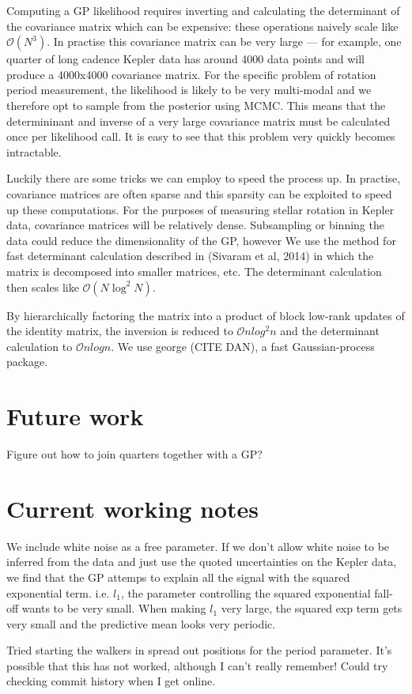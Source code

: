 \documentclass[12pt,preprint]{aastex}
\begin{document}
Computing a GP likelihood requires inverting and calculating the determinant of the covariance matrix which can be expensive:
these operations naively scale like $\mathcal{O}(N^3)$.
In practise this covariance matrix can be very large --- for example, one quarter of long cadence Kepler data has around 4000 data points and will produce a 4000x4000 covariance matrix.
For the specific problem of rotation period measurement, the likelihood is likely to be very multi-modal and we therefore opt to sample from the posterior using MCMC.
This means that the determininant and inverse of a very large covariance matrix must be calculated once per likelihood call.
It is easy to see that this problem very quickly becomes intractable.

Luckily there are some tricks we can employ to speed the process up. %
In practise, covariance matrices are often sparse and this sparsity can be exploited to speed up these computations.
For the purposes of measuring stellar rotation in Kepler data, covariance matrices will be relatively dense.
Subsampling or binning the data could reduce the dimensionality of the GP, however %
We use the method for fast determinant calculation described in (Sivaram et al, 2014) in which the matrix is decomposed into smaller matrices, etc.
The determinant calculation then scales like $\mathcal{O}(N\log^2{N})$.

By hierarchically factoring the matrix into a product of block low-rank updates of the identity matrix, the inversion is reduced to $\mathcal{O}nlog^2n$ and the determinant calculation to $\mathcal{O}nlogn$.
We use george (CITE DAN), a fast Gaussian-process package.

\section{Future work}

Figure out how to join quarters together with a GP?

\section{Current working notes}

We include white noise as a free parameter.
If we don't allow white noise to be inferred from the data and just use the quoted uncertainties on the Kepler data, we find that the GP attemps to explain all the signal with the squared exponential term.
i.e. $l_1$, the parameter controlling the squared exponential fall-off wants to be very small.
When making $l_1$ very large, the squared exp term gets very small and the predictive mean looks very periodic.

Tried starting the walkers in spread out positions for the period parameter.
It's possible that this has not worked, although I can't really remember!
Could try checking commit history when I get online.
\end{document}
